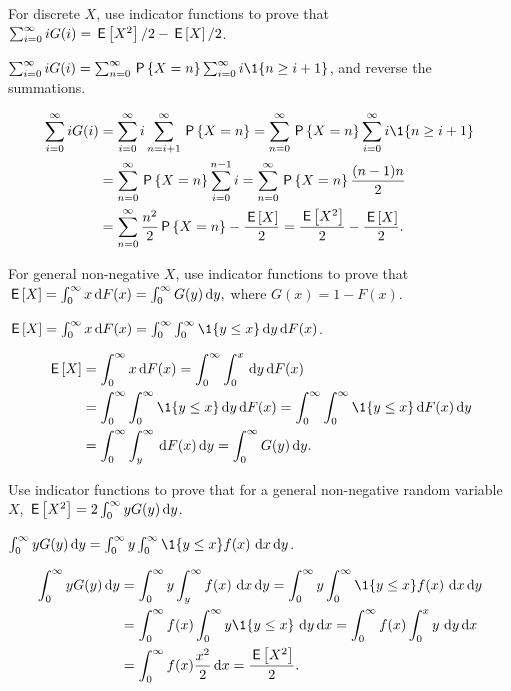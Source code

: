 \documentclass[queueing-book]{subfiles}
\begin{document}
\begin{exercise}\label{ex:66}
For discrete $X$,  use indicator functions to prove that
$\sum_{i=0}^\infty i G(i) = \,\mathsf{E}\left[X^2\right]/2 - \,\mathsf{E}\left[X\right]/2$.
\begin{hint}
$\sum_{i=0}^\infty i G(i) = \sum_{n=0}^\infty \P{X=n} \sum_{i=0}^\infty i \1{n\geq i+1}$,
and reverse the summations.
\end{hint}
\begin{solution}
\begin{align*}
\sum_{i=0}^\infty i G(i)
&= \sum_{i=0}^\infty i \sum_{n=i+1}^\infty \P{X=n} = \sum_{n=0}^\infty \P{X=n} \sum_{i=0}^\infty i \1{n\geq i+1} \\
&= \sum_{n=0}^\infty \P{X=n} \sum_{i=0}^{n-1}i = \sum_{n=0}^\infty \P{X=n} \frac{(n-1)n}{2} \\
&= \sum_{n=0}^\infty \frac{n^2}{2} \P{X=n} - \frac{\E X}{2}
= \frac{\E{X^2}}{2} - \frac{\E X}{2}.
\end{align*}
\end{solution}
\end{exercise}

\begin{exercise}\label{ex:l-107}
For  general non-negative $X$,  use indicator functions to prove that
$ \,\mathsf{E}\left[X\right] = \int_0^\infty x \,\textrm{d}F(x) = \int_0^\infty G(y) \,\textrm{d}y,$
where $G(x) = 1 - F(x)$.
\begin{hint}
$\E X = \int_0^\infty x \d F( x) = \int_0^\infty \int_0^\infty \1{y\leq x} \d y \d F(x)$.
\end{hint}
\begin{solution}
 \begin{align*}
 \E{X} &= \int_0^\infty x \d F(x) = \int_0^\infty \int_0^x \d y \d F(x) \\
 & = \int_0^\infty \int_0^\infty \1{y\leq x} \d y \d F(x) = \int_0^\infty \int_0^\infty \1{y\leq x} \d F(x) \d y\\
 & = \int_0^\infty \int_y^\infty\d  F(x) \d y = \int_0^\infty G(y) \d y.
 \end{align*}
\end{solution}
\end{exercise}


\begin{exercise}
  Use indicator functions to prove that for a general non-negative random variable~$X$, $ \,\mathsf{E}\left[X^2\right] = 2 \int_0^\infty y G(y) \,\textrm{d}y$.
\begin{hint}
$\int_0^\infty y G(y) \d y = \int_0^\infty y \int_0^\infty \1{y\leq x}f(x)\, \d x \d y$.
\end{hint}
\begin{solution}
 \begin{align*}
\int_0^\infty y G(y) \d y
&= \int_0^\infty y \int_y^\infty f(x)\, \d x \d y = \int_0^\infty y \int_0^\infty \1{y\leq x}f(x)\, \d x \d y\\
&= \int_0^\infty f(x) \int_0^\infty y \1{y \leq x}\, \d y \d x
= \int_0^\infty f(x) \int_0^x y\, \d y \d x\\
&= \int_0^\infty f(x) \frac{x^2}2 \d x =\frac{\E{X^2}}2.
 \end{align*}
\end{solution}
\end{exercise}
\end{document}
